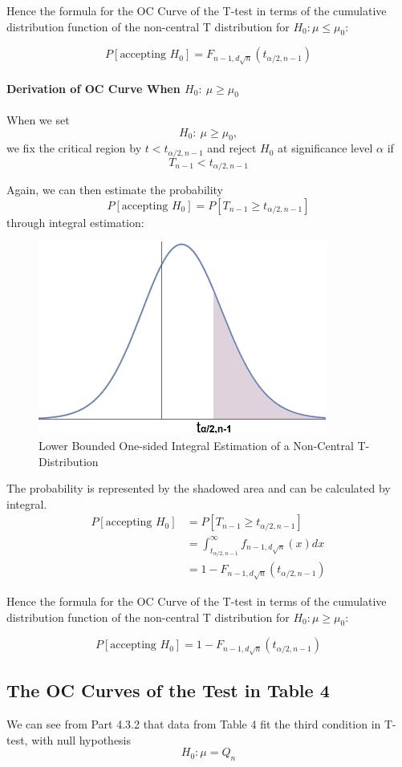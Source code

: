 \documentclass[a4paper]{article}
\begin{document}
Hence the formula for the OC Curve of the T-test in terms of the cumulative distribution function of the non-central T distribution for $H_0: \mu\leq\mu_0$:

$$P[\text{accepting }H_0]= F_{n-1,d\sqrt{n}}(t_{\alpha/2,n-1})$$

\paragraph{Derivation of OC Curve When $H_0:\ \mu \geq \mu_0$}
When we set
$$H_0:\ \mu \geq \mu_0,$$
we fix the critical region by $t<t_{\alpha/2,n-1}$ and reject $H_0$ at significance level $\alpha$ if
$$T_{n-1}<t_{\alpha/2,n-1}$$

Again, we can then estimate the probability
$$P[\text{accepting }H_0] = P[T_{n-1} \geq t_{\alpha/2,n-1}]$$ through integral estimation:

\begin{figure}[!htbp] 
\centering 
\includegraphics[width=0.6\linewidth]{nct1l.png}  
\caption{Lower Bounded One-sided Integral Estimation of a Non-Central T-Distribution} 
\end{figure}

The probability is represented by the shadowed area and can be calculated by integral.
\begin{align*}
P[\text{accepting }H_0]
&= P[T_{n-1} \geq t_{\alpha/2,n-1}]\\
&= \int_{t_{\alpha/2,n-1}}^{\infty} f_{n-1,d\sqrt{n}}(x) dx\\
&= 1-F_{n-1,d\sqrt{n}}(t_{\alpha/2,n-1})
\end{align*}

Hence the formula for the OC Curve of the T-test in terms of the cumulative distribution function of the non-central T distribution for $H_0: \mu\geq\mu_0$:

$$P[\text{accepting }H_0]= 1-F_{n-1,d\sqrt{n}}(t_{\alpha/2,n-1})$$
\subsection{The OC Curves of the Test in Table 4}
We can see from Part 4.3.2 that data from Table 4 fit the third condition in T-test, with null hypothesis
$$H_0: \mu=Q_n$$
\end{document}
